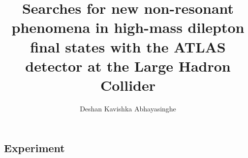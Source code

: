 \documentclass[11pt,a4paper,hyperpdf,oneside,nobind]{AJBthesis}
\title{\texorpdfstring{Searches for new non-resonant phenomena in high-mass dilepton final states with the ATLAS detector at the Large Hadron Collider}{Searches for new non-resonant phenomena in high-mass dilepton final states with the ATLAS detector at the Large Hadron Collider}}
\author{Deshan Kavishka Abhayasinghe}
\begin{document}
\begin{frontmatter}
    
\end{frontmatter}

\begin{mainmatter}
    \linenumbers
    \part{Experiment}
\end{mainmatter}

\clearpage

\begin{backmatter}
     
     
        
\end{backmatter}

\let\svaddcontentsline\addcontentsline
    \renewcommand\addcontentsline[3]{%
        \edef\qtest{#1}%
        \def\qmatch{lof}%
        \ifx\qmatch\qtest\else%
            \def\qmatch{lot}%
            \ifx\qmatch\qtest\else%
                \svaddcontentsline{#1}{#2}{#3}%
        \fi\fi%
    }

\begin{appendices}
\end{appendices}
\end{document}

